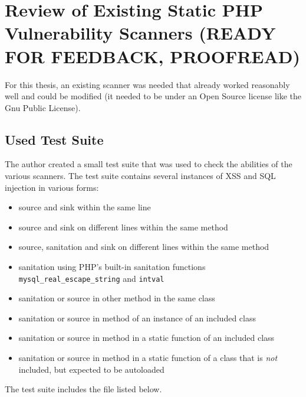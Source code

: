 \chapter{Review of Existing Static PHP Vulnerability Scanners (READY FOR FEEDBACK, PROOFREAD)}
\label{scanners}

For this thesis, an existing scanner was needed that already worked reasonably well and could be modified (\ie it needed to be under an Open Source license like the Gnu Public License).

\section{Used Test Suite}
The author created a small test suite that was used to check the abilities of the various scanners. The test suite contains several instances of XSS and SQL injection in various forms:
\begin{itemize}
 \item source and sink within the same line
 \item source and sink on different lines within the same method
 \item source, sanitation and sink on different lines within the same method
 \item sanitation using PHP's built-in sanitation functions \texttt{mysql\_real\_escape\_string} and \texttt{intval}
 \item sanitation or source in other method in the same class
 \item sanitation or source in method of an instance of an included class
 \item sanitation or source in method in a static function of an included class
 \item sanitation or source in method in a static function of a class that is \emph{not} included, but expected to be autoloaded
\end{itemize}

The test suite includes the file listed below.



